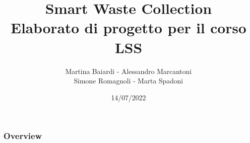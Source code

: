 \documentclass[
    11pt, %
]{beamer}
\title[swc]{Smart Waste Collection \\ Elaborato di progetto per il corso LSS}
\author[Baiardi, Marcantoni, Romagnoli, Spadoni]{Martina Baiardi - Alessandro Marcantoni\\Simone Romagnoli - Marta Spadoni}
\date[14/07/2022]{14/07/2022}
\begin{document}
    \begin{frame}
        \titlepage
    \end{frame}

    \begin{frame}
        \frametitle{Overview}
        \tableofcontents
    \end{frame}

    
    
    
    
    
\end{document}
